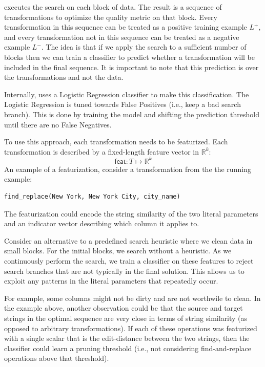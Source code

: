 
\sys executes the search on each block of data.
The result is a sequence of transformations to optimize the quality metric on that block.
Every transformation in this sequence can be treated as a positive training example $L^+$, and every transformation not in this sequence can be treated as a negative example $L^-$.
The idea is that if we apply the search to a sufficient number of blocks then we can train a classifier to predict whether a transformation will be included in the final sequence.
It is important to note that this prediction is over the transformations and not the data. 

Internally, \sys uses a Logistic Regression classifier to make this classification. The Logistic Regression is tuned towards False Positives (i.e., keep a bad search branch). This is done by training the model and shifting the prediction threshold until there are no False Negatives. 


To use this approach, each transformation needs to be featurized.
Each transformation is described by a fixed-length feature vector in $\mathbb{R}^k$:
\[
\textsf{feat}: T \mapsto \mathbb{R}^k 
\]
An example of a featurization, consider a transformation from the the running example:
\begin{lstlisting}
find_replace(New York, New York City, city_name)
\end{lstlisting}
The featurization could encode the string similarity of the two literal parameters and an indicator vector describing which column it applies to.

Consider an alternative to a predefined search heuristic where we clean data in small blocks.
For the initial blocks, we search without a heuristic.
As we continuously perform the search, we train a classifier on these features to reject search branches that are not typically in the final solution.
This allows us to exploit any patterns in the literal parameters that repeatedly occur.

For example, some columns might not be dirty and are not worthwile to clean.
In the example above, another observation could be that the source and target strings in the optimal sequence are very close in terms of string similarity (as opposed to arbitrary transformations).
If each of these operations was featurized with a single scalar that is the edit-distance between the two strings, then the classifier could learn a pruning threshold (i.e., not considering find-and-replace operations above that threshold).



